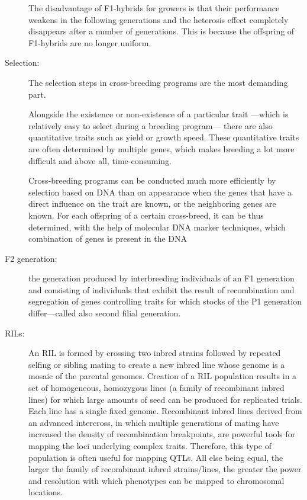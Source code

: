 \documentclass[a4paper,10pt]{article}
\begin{document}
\begin{description}
The disadvantage of F1-hybrids for growers is that their performance weakens in the following generations and the heterosis effect completely disappears after a number of generations. 
This is because the offspring of F1-hybrids are no longer uniform.

\item[Selection:] The selection steps in cross-breeding programs are the most demanding part.

Alongside the existence or non-existence of a particular trait —which is relatively easy to select during a breeding program— there are also quantitative traits such as yield or growth speed. 
These quantitative traits are often determined by multiple genes, which makes breeding a lot more difficult and above all, time-consuming.

Cross-breeding programs can be conducted much more efficiently by selection based on DNA than on appearance when the genes that have a direct influence on the trait are known, or the neighboring genes are known. 
For each offspring of a certain cross-breed, it can be thus determined, with the help of molecular DNA marker techniques, which combination of genes is present in the DNA

\item[F2 generation:] the generation produced by interbreeding individuals of an F1 generation and consisting of individuals that exhibit the result of recombination and segregation of genes controlling traits	 for which stocks of the P1 generation differ—called also second filial generation.


\item[RILs:] 
An RIL is formed by crossing two inbred strains followed by repeated selfing or sibling mating to create a new inbred line whose genome is a mosaic of the parental genomes.
Creation of a RIL population results in a set of homogeneous, homozygous lines (a family of recombinant inbred lines) for which large amounts of seed can be produced for replicated trials. Each line has a single fixed genome.
Recombinant inbred lines derived from an advanced intercross, in which multiple generations of mating have increased the density of recombination breakpoints, are powerful tools for mapping the loci underlying complex traits. 
Therefore, this type of population is often useful for mapping QTLs. All else being equal, the larger the family of recombinant inbred strains/lines, the greater the power and resolution with which phenotypes can be mapped to chromosomal locations.


\end{description}
\end{document}
